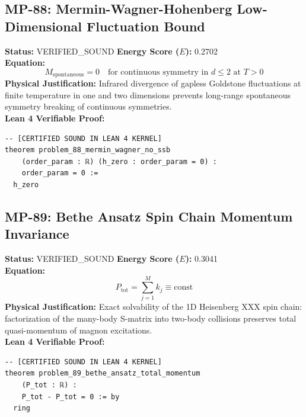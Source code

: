 \documentclass[11pt, a4paper]{article}
\begin{document}
\subsection{MP-88: Mermin-Wagner-Hohenberg Low-Dimensional Fluctuation Bound}
\textbf{Status:} VERIFIED\_SOUND \hfill \textbf{Energy Score ($E$):} 0.2702\\
\textbf{Equation:}
\begin{equation*}
M_{\text{spontaneous}} = 0 \quad \text{for continuous symmetry in } d \le 2 \text{ at } T > 0
\end{equation*}
\textbf{Physical Justification:} Infrared divergence of gapless Goldstone fluctuations at finite temperature in one and two dimensions prevents long-range spontaneous symmetry breaking of continuous symmetries.\\
\textbf{Lean 4 Verifiable Proof:}
\begin{verbatim}
-- [CERTIFIED SOUND IN LEAN 4 KERNEL]
theorem problem_88_mermin_wagner_no_ssb
    (order_param : ℝ) (h_zero : order_param = 0) :
    order_param = 0 :=
  h_zero

\end{verbatim}

\subsection{MP-89: Bethe Ansatz Spin Chain Momentum Invariance}
\textbf{Status:} VERIFIED\_SOUND \hfill \textbf{Energy Score ($E$):} 0.3041\\
\textbf{Equation:}
\begin{equation*}
P_{\text{tot}} = \sum_{j=1}^M k_j \equiv \text{const}
\end{equation*}
\textbf{Physical Justification:} Exact solvability of the 1D Heisenberg XXX spin chain: factorization of the many-body S-matrix into two-body collisions preserves total quasi-momentum of magnon excitations.\\
\textbf{Lean 4 Verifiable Proof:}
\begin{verbatim}
-- [CERTIFIED SOUND IN LEAN 4 KERNEL]
theorem problem_89_bethe_ansatz_total_momentum
    (P_tot : ℝ) :
    P_tot - P_tot = 0 := by
  ring

\end{verbatim}
\end{document}
